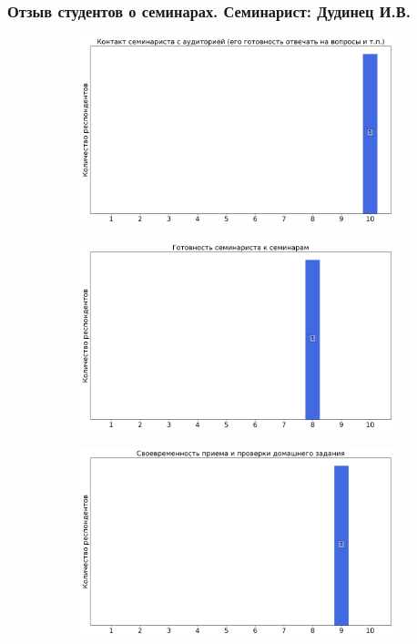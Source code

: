     \subsubsection{Отзыв студентов о семинарах. Семинарист: Дудинец И.В.}
		\begin{figure}[H]
			\centering
			\begin{subfigure}[b]{0.45\textwidth}
				\centering
				\includegraphics[width=\textwidth]{images/4 course/Квантовая механика/seminarists-marks-Дудинец И.В.-0.png}
			\end{subfigure}
			\begin{subfigure}[b]{0.45\textwidth}
				\centering
				\includegraphics[width=\textwidth]{images/4 course/Квантовая механика/seminarists-marks-Дудинец И.В.-1.png}
			\end{subfigure}
			\begin{subfigure}[b]{0.45\textwidth}
				\centering
				\includegraphics[width=\textwidth]{images/4 course/Квантовая механика/seminarists-marks-Дудинец И.В.-2.png}

\end{subfigure}
\end{figure}
